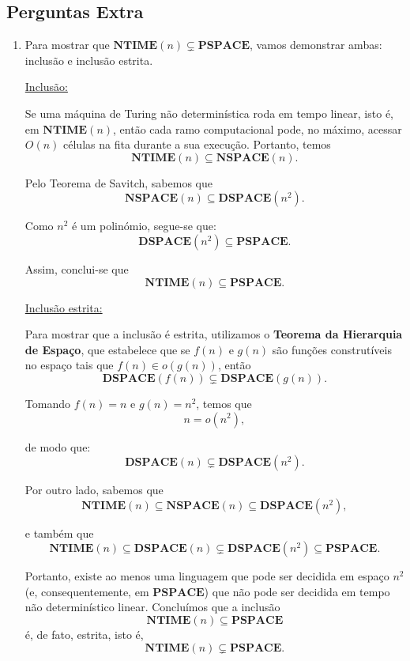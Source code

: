 \documentclass[a4paper,12pt]{article}
\begin{document}
\vspace{1.0cm}
\subsection*{Perguntas Extra}

\begin{enumerate}[label=\arabic*)]
  \item Para mostrar que $\textbf{NTIME}(n) \subsetneq \textbf{PSPACE}$, vamos demonstrar ambas: inclusão e inclusão estrita.

  \vspace{0.3cm}
  \underline{Inclusão:}  
  
  Se uma máquina de Turing não determinística roda em tempo linear, isto é, em \(\mathbf{NTIME}(n)\), então cada ramo computacional pode, no máximo, acessar \(O(n)\) células na fita durante a sua execução.  
  Portanto, temos
  \[
  \mathbf{NTIME}(n) \subseteq \mathbf{NSPACE}(n).
  \]
  
  Pelo Teorema de Savitch, sabemos que
  \[
  \mathbf{NSPACE}(n) \subseteq \mathbf{DSPACE}(n^2).
  \]
  
  Como \(n^2\) é um polinómio, segue-se que:
  \[
  \mathbf{DSPACE}(n^2) \subseteq \mathbf{PSPACE}.
  \]
  
  Assim, conclui-se que
  \[
  \mathbf{NTIME}(n) \subseteq \mathbf{PSPACE}.
  \]

  \vspace{0.3cm}
  \underline{Inclusão estrita:}  
  
  Para mostrar que a inclusão é estrita, utilizamos o \textbf{Teorema da Hierarquia de Espaço}, que estabelece que se \(f(n)\) e \(g(n)\) são funções construtíveis no espaço tais que \(f(n) \in o(g(n))\), então
  \[
  \mathbf{DSPACE}(f(n)) \subsetneq \mathbf{DSPACE}(g(n)).
  \]
  
  Tomando \(f(n) = n\) e \(g(n) = n^2\), temos que
  \[
  n = o(n^2),
  \]
  
  de modo que:
  \[
  \mathbf{DSPACE}(n) \subsetneq \mathbf{DSPACE}(n^2).
  \]
  
  Por outro lado, sabemos que
  \[
  \mathbf{NTIME}(n) \subseteq \mathbf{NSPACE}(n) \subseteq \mathbf{DSPACE}(n^2),
  \]
  
  e também que
  \[
  \mathbf{NTIME}(n) \subseteq \mathbf{DSPACE}(n) \subsetneq \mathbf{DSPACE}(n^2) \subseteq \mathbf{PSPACE}.
  \]
  
  Portanto, existe ao menos uma linguagem que pode ser decidida em espaço \(n^2\) (e, consequentemente, em \(\mathbf{PSPACE}\)) que não pode ser decidida em tempo não determinístico linear.  
  Concluímos que a inclusão
  \[
  \mathbf{NTIME}(n) \subseteq \mathbf{PSPACE}
  \]
  é, de fato, estrita, isto é,
  \[
  \mathbf{NTIME}(n) \subsetneq \mathbf{PSPACE}.
  \]

\end{enumerate}
\end{document}
